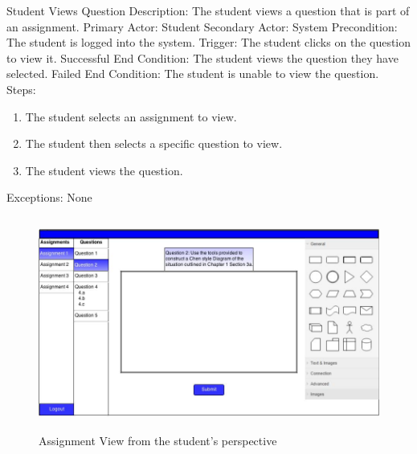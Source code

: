     
    \begin{section}{Student Views Question}
        Description: The student views a question that is part of an assignment. \newline
        Primary Actor: Student \newline
        Secondary Actor: System \newline
        Precondition: The student is logged into the system. \newline
        Trigger: The student clicks on the question to view it. \newline
        Successful End Condition: The student views the question they have selected. \newline
        Failed End Condition: The student is unable to view the question. \newline
        \newline
        Steps:
        \begin{enumerate}
            \item{The student selects an assignment to view.}
            \item{The student then selects a specific question to view.}
            \item{The student views the question.}
        \end{enumerate}
        Exceptions: None
        
                    \begin{figure}[H]
            \centerline{\includegraphics[height=7cm]{StudentQuestion.jpg}}
            \caption{Assignment View from the student's perspective}
    \end{figure}
        
    \end{section}

    
    
